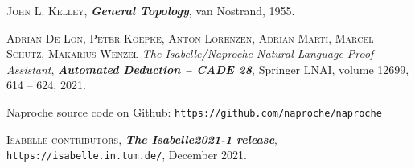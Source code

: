 \documentclass[bsl,meeting]{asl}
\begin{document}
\begin{thebibliography}{10}

{\scshape John L. Kelley},
{\bfseries\itshape General Topology},
van Nostrand, 1955.

{\scshape Adrian De Lon, Peter Koepke, Anton Lorenzen, Adrian Marti,
Marcel Sch{\"u}tz, Makarius Wenzel}
{\itshape The Isabelle/Naproche Natural Language Proof Assistant},
{\bfseries\itshape Automated Deduction -- CADE 28},
Springer LNAI, volume 12699, 614 -- 624,
2021.

Naproche source code on Github: 
\verb+https://github.com/naproche/naproche+


{\scshape Isabelle contributors},
{\bfseries\itshape The Isabelle2021-1 release},\\
\verb+https://isabelle.in.tum.de/+,
December 2021.






\end{thebibliography}


\vspace*{-0.5\baselineskip}
\end{document}
